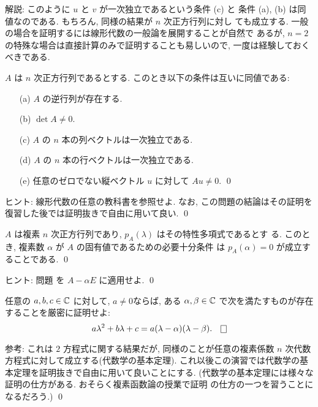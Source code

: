 \documentclass[12pt,twoside]{jarticle}
\begin{document}
\noindent 
解説: このように $u$ と $v$ が一次独立であるという条件 (c) と
条件 (a), (b) は同値なのである. もちろん, 同様の結果が $n$ 次正方行列に対し
ても成立する. 一般の場合を証明するには線形代数の一般論を展開することが自然で
あるが, $n=2$ の特殊な場合は直接計算のみで証明することも易しいので, 
一度は経験しておくべきである.


\begin{question}[15点]\label{q:det-nxn}
  $A$ は $n$ 次正方行列であるとする. このとき以下の条件は互いに同値である:
  \begin{enumerate}
  \item[(a)] $A$ の逆行列が存在する.
  \item[(b)] $\det A \ne 0$.
  \item[(c)] $A$ の $n$ 本の列ベクトルは一次独立である.
  \item[(d)] $A$ の $n$ 本の行ベクトルは一次独立である.
  \item[(e)] 任意のゼロでない縦ベクトル $u$ に対して $Au\ne0$.
    \qed
  \end{enumerate}
\end{question}

\noindent 
ヒント: 線形代数の任意の教科書を参照せよ. なお, 
この問題の結論はその証明を復習した後では証明抜きで自由に用いて良い.
\qed


\begin{question}[5点]
  $A$ は複素 $n$ 次正方行列であり, $p_A(\lambda)$ はその特性多項式であるとす
  る.  このとき, 複素数 $\alpha$ が $A$ の固有値であるための必要十分条件
  は $p_A(\alpha)=0$ が成立することである. 
  \qed
\end{question}

\noindent 
ヒント: 問題  を $A - \alpha E$ に適用せよ.
\qed


\begin{question}[5点]
  任意の $a,b,c\in{\mathbb C}$ に対して, $a\ne0$ならば, 
  ある $\alpha,\beta\in{\mathbb C}$ で次を満たすものが存在することを厳密に証明せよ:
  \begin{equation*}
    a \lambda^2 + b \lambda + c 
    = a(\lambda - \alpha)(\lambda - \beta).
    \qed
  \end{equation*}
\end{question}

\noindent 
参考: これは $2$ 方程式に関する結果だが, 
同様のことが任意の複素係数 $n$ 次代数方程式に対して成立する(代数学の基本定理). 
これ以後この演習では代数学の基本定理を証明抜きで自由に用いて良いことにする. 
(代数学の基本定理には様々な証明の仕方がある. おそらく複素函数論の授業で証明
の仕方の一つを習うことになるだろう.)
\qed
\end{document}
